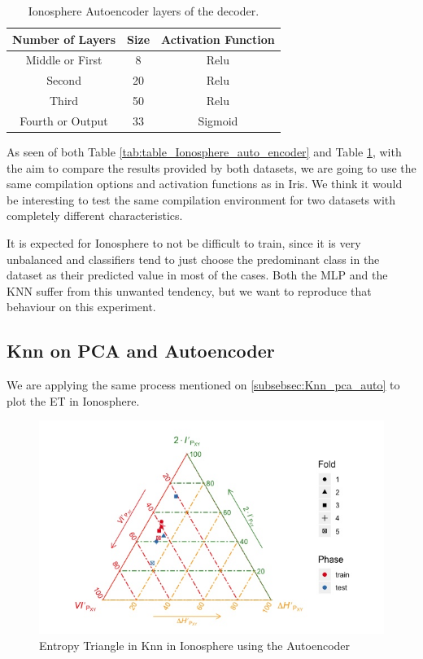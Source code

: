 \begin{table}[H]
	\caption{Ionosphere Autoencoder layers of the decoder.}
	\begin{center}
		\label{tab:table_Ionosphere_auto_decoder}
		\begin{tabular}{c|c|c} %
			\textbf{Number of Layers} & \textbf{Size} & \textbf{Activation Function} \\
			\hline
			Middle or First & 8 & Relu\\
			Second & 20 & Relu\\
			Third & 50 & Relu\\
			Fourth or Output & 33 & Sigmoid\\
		\end{tabular}
	\end{center}
\end{table}

As seen of both Table \ref{tab:table_Ionosphere_auto_encoder} and Table \ref{tab:table_Ionosphere_auto_decoder}, with the aim to compare the results provided by both datasets, we are going to use the same compilation options and activation functions as in Iris. We think it would be interesting to test the same compilation environment for two datasets with completely different characteristics.\par

It is expected for Ionosphere to not be difficult to train, since it is very unbalanced and classifiers tend to just choose the predominant class in the dataset as their predicted value in most of the cases. Both the MLP and the KNN suffer from this unwanted tendency, but we want to reproduce that behaviour on this experiment.

\subsection{Knn on PCA and Autoencoder}

We are applying the same process mentioned on \ref{subsebsec:Knn_pca_auto} to plot the ET in Ionosphere. 

\begin{figure}[H]
	\centering
	\includegraphics[width=1\linewidth]{Figuras_tfg/ET_knn_Ionosphere_auto}
	\caption{Entropy Triangle in Knn in Ionosphere using the Autoencoder}
	\label{fig:figure_Knn_Ionosphere_ET_Auto}
\end{figure}

